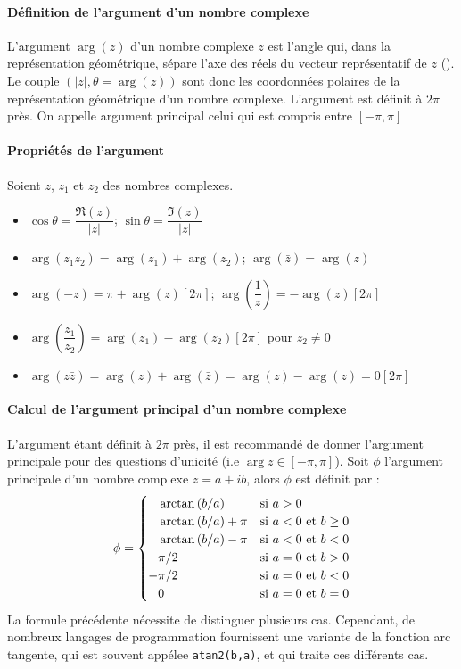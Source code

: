 \paragraph{Définition de l'argument d'un nombre complexe}
L'argument $\arg{(z)}$ d'un nombre complexe $z$ est l'angle qui, dans la représentation géométrique, sépare l'axe des réels du vecteur représentatif de $z$ ().
Le couple $(|z|,\theta=\arg{(z)})$ sont donc les coordonnées polaires de la représentation géométrique d'un nombre complexe.
L'argument est définit à $2\pi$ près. On appelle argument principal celui qui est compris entre $[-\pi,\pi]$

\newpage
\paragraph{Propriétés de l'argument}
Soient $z$, $z_1$ et $z_2$ des nombres complexes.
\begin{itemize}
    \item $\cos\theta=\dfrac{\Re(z)}{|z|}$; $\sin\theta=\dfrac{\Im(z)}{|z|}$
    \item $\arg(z_1z_2)=\arg(z_1)+\arg(z_2)$; $\arg(\bar{z})=\arg(z)$
    \item $\arg(-z)=\pi+\arg(z)[2\pi]$; $\arg\left(\dfrac{1}{z}\right)=-\arg(z)[2\pi]$
    \item $\arg\left(\dfrac{z_1}{z_2}\right)=\arg(z_1)-\arg(z_2)[2\pi]$ pour $z_2\neq0$
    \item $\arg(z\bar{z})=\arg(z)+\arg(\bar{z})=\arg(z)-\arg(z)=0[2\pi]$
\end{itemize}

\paragraph{Calcul de l'argument principal d'un nombre complexe}
L'argument étant définit à $2\pi$ près, il est recommandé de donner l'argument principale 
pour des questions d'unicité (i.e $\arg{z}\in[-\pi,\pi]$). 
Soit $\phi$ l'argument principale d'un nombre complexe $z=a+ib$, alors $\phi$ est définit par :
$$
\phi=
\begin{cases}
    \hphantom{-}\arctan{(b/a)}     & \text{si $a>0$} \\
    \hphantom{-}\arctan{(b/a)}+\pi & \text{si $a<0$ et $b\ge0$} \\
    \hphantom{-}\arctan{(b/a)}-\pi & \text{si $a<0$ et $b<0$} \\
    \hphantom{-} \pi/2             & \text{si $a=0$ et $b>0$} \\
                -\pi/2             & \text{si $a=0$ et $b<0$} \\
    \hphantom{-}0                  & \text{si $a=0$ et $b=0$} \\
\end{cases}
$$
La formule précédente nécessite de distinguer plusieurs cas.
Cependant, de nombreux langages de programmation fournissent
une variante de la fonction arc tangente, qui est souvent appélee
\verb?atan2(b,a)?, et qui traite ces différents cas. 

